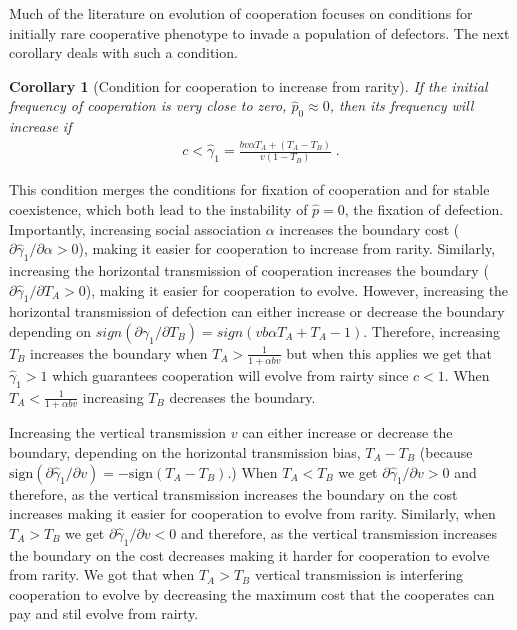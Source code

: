 \documentclass[12pt]{extarticle}
\newtheorem{corollary}{Corollary}
\begin{document}
{Much of the literature on evolution of cooperation focuses on conditions for  initially rare cooperative phenotype to invade a population of defectors.
The next corollary deals with such a condition.
\\

\begin{corollary}[Condition for cooperation to increase from rarity]
\label{corollary:rarity}
  If the initial frequency of cooperation is very close to zero, $\hat{p}_0 \approx 0$, then its frequency will increase if 
  \begin{equation} \label{eq:unequal_transmission_from_rarity_general_case}
  \begin{aligned}
  c < \hat\gamma_1 = \frac{b v \alpha T_A + (T_A - T_B)}{v(1-T_B)} \;.
  \end{aligned}
  \end{equation} 
  \end{corollary}

This condition merges the conditions for fixation of cooperation and for stable coexistence, which both lead to the instability of $\hat{p}=0$, the fixation of defection.
Importantly, increasing social association $\alpha$ increases the boundary cost ($\partial \hat\gamma_1 / \partial \alpha > 0$), making it easier for cooperation to increase from rarity.
Similarly, increasing the horizontal transmission of cooperation increases the boundary ($\partial \hat\gamma_1 / \partial T_A > 0$), making it easier for cooperation to evolve.
However, increasing the horizontal transmission of defection can either increase or decrease the boundary depending on $sign(\partial\gamma_1/\partial T_B) = sign(vb \alpha T_A+T_A-1)$. 
Therefore, increasing $T_B$ increases the boundary when $T_A > \frac{1}{1+\alpha b v}$ but when this applies we get that $\hat\gamma_1 > 1$ which guarantees cooperation will evolve from rairty since $c<1$.
When $T_A < \frac{1}{1+\alpha b v}$ increasing $T_B$ decreases the boundary.

Increasing the vertical transmission $v$ can either increase or decrease the boundary, depending on the horizontal transmission bias, $T_A-T_B$ (because $\text{sign}(\partial \hat\gamma_1 / \partial v) = -\text{sign}(T_A-T_B)$.)
When $T_A<T_B$ we get $\partial \hat\gamma_1 / \partial v >0$ and therefore, as the vertical transmission increases the boundary on the cost increases making it easier for cooperation to evolve from rarity. 
Similarly, when $T_A > T_B$ we get $\partial \hat\gamma_1 / \partial v <0$ and therefore, as the vertical transmission increases the boundary on the cost decreases making it harder for cooperation to evolve from rarity.
We got that when $T_A>T_B$ vertical transmission is interfering cooperation to evolve by decreasing the maximum cost that the cooperates can pay and stil evolve from rairty. 


}
\end{document}
